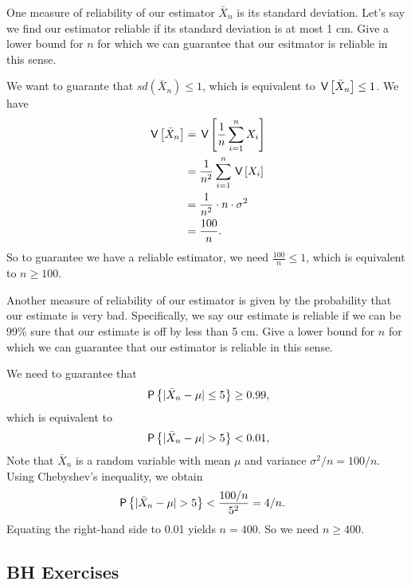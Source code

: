 \begin{exercise}
One measure of reliability of our estimator $\bar{X}_n$ is its standard deviation. Let's say we find our estimator reliable if its standard deviation is at most 1 cm. Give a lower bound for $n$ for which we can guarantee that our esitmator is reliable in this sense.
\begin{solution}
We want to guarante that $sd(\bar{X}_n) \leq 1$, which is equivalent to $\V{\bar{X}_n} \leq 1$. We have
\begin{align}
    \V{\bar{X}_n} &= \V{\frac{1}{n}\sum_{i=1}^n X_i} \\
    &= \frac{1}{n^2} \sum_{i=1}^n \V{X_i} \\
    &= \frac{1}{n^2} \cdot n \cdot \sigma^2 \\
    &= \frac{100}{n}.
\end{align}
So to guarantee we have a reliable estimator, we need $\frac{100}{n} \leq 1$, which is equivalent to $n \geq 100$.
\end{solution}
\end{exercise}

\begin{exercise}
Another measure of reliability of our estimator is given by the probability that our estimate is very bad. Specifically, we say our estimate is reliable if we can be 99\% sure that our estimate is off by less than 5 cm. Give a lower bound for $n$ for which we can guarantee that our estimator is reliable in this sense.
\begin{solution}
We need to guarantee that
\begin{align}
    \P{| \bar{X}_n - \mu | \leq 5} \geq 0.99,
\end{align}
which is equivalent to
\begin{align}
    \P{| \bar{X}_n - \mu | > 5} < 0.01,
\end{align}
Note that $\bar{X}_n$ is a random variable with mean $\mu$ and variance $\sigma^2/n = 100/n$. Using Chebyshev's inequality, we obtain
\begin{align}
    \P{| \bar{X}_n - \mu | > 5} &< \frac{100/n}{5^2} = 4/n.
\end{align}
Equating the right-hand side to 0.01 yields $n=400$. So we need $n \geq 400$.
\end{solution}
\end{exercise}


\subsection{BH Exercises}

